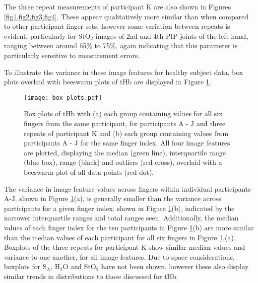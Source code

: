 \documentclass[twoside]{bhamthesis}
\theoremstyle{definition}
\begin{document}
The three repeat measurements of participant K are also shown in Figures \cref{fig1,fig2,fig3,fig4}. These appear qualitatively more similar than when compared to other participant finger sets, however some variation between repeats is evident, particularly for $\mathrm{StO_2}$ images of 2nd and 4th PIP joints of the left hand, ranging between around 65\% to 75\%, again indicating that this parameter is particularly sensitive to measurement errors. 

To illustrate the variance in these image features for healthy subject data, box plots overlaid with beeswarm plots of tHb are displayed in Figure \ref{box_plots}.

\begin{figure}[!ht]
\centering\texttt{[image: box\_plots.pdf]}
\caption{Box plots of tHb with (a) each group containing values for all six fingers from the same participant, for participants A - J and three repeats of participant K and (b) each group containing values from participants A - J for the same finger index. All four image features are plotted, displaying the median (green line), interquartile range (blue box), range (black) and outliers (red cross), overlaid with a beeswarm plot of all data points (red dot).}
\label{box_plots}
\end{figure}

The variance in image feature values across fingers within individual participants A-J, shown in Figure \ref{box_plots}(a), is generally smaller than the variance across participants for a given finger index, shown in Figure \ref{box_plots}(b), indicated by the narrower interquartile ranges and total ranges seen. Additionally, the median values of each finger index for the ten participants in Figure \ref{box_plots}(b) are more similar than the median values of each participant for all six fingers in Figure \ref{box_plots}.(a). Boxplots of the three repeats for participant K show similar median values and variance to one another, for all image features. Due to space considerations, boxplots for $\mathrm{S_A}$, $\mathrm{H_2O}$ and $\mathrm{StO_2}$ have not been shown, however these also display similar trends in distributions to those discussed for tHb.
\end{document}
